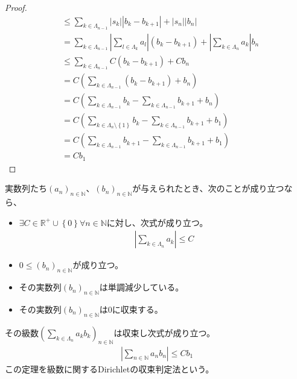 \documentclass[dvipdfmx]{jsarticle}
\begin{document}
\begin{proof}
\begin{align*}
&\leq \sum_{k \in \varLambda_{n - 1}} {\left| s_{k} \right|\left| b_{k} - b_{k + 1} \right|} + \left| s_{n} \right|\left| b_{n} \right|\\
&= \sum_{k \in \varLambda_{n - 1}} {\left| \sum_{l \in \varLambda_{k}} a_{l} \right|\left( b_{k} - b_{k + 1} \right)} + \left| \sum_{k \in \varLambda_{n}} a_{k} \right|b_{n}\\
&\leq \sum_{k \in \varLambda_{n - 1}} {C\left( b_{k} - b_{k + 1} \right)} + Cb_{n}\\
&= C\left( \sum_{k \in \varLambda_{n - 1}} \left( b_{k} - b_{k + 1} \right) + b_{n} \right)\\
&= C\left( \sum_{k \in \varLambda_{n - 1}} b_{k} - \sum_{k \in \varLambda_{n - 1}} b_{k + 1} + b_{n} \right)\\
&= C\left( \sum_{k \in \varLambda_{n} \setminus \left\{ 1 \right\}} b_{k} - \sum_{k \in \varLambda_{n - 1}} b_{k + 1} + b_{1} \right)\\
&= C\left( \sum_{k \in \varLambda_{n - 1}} b_{k + 1} - \sum_{k \in \varLambda_{n - 1}} b_{k + 1} + b_{1} \right)\\
&= Cb_{1}
\end{align*}
\end{proof}
\begin{thm}[級数に関するDirichletの収束判定法]\label{4.1.8.27}
実数列たち$\left( a_{n} \right)_{n \in \mathbb{N}}$、$\left( b_{n} \right)_{n \in \mathbb{N}}$が与えられたとき、次のことが成り立つなら、
\begin{itemize}
\item
  $\exists C \in \mathbb{R}^{+} \cup \left\{ 0 \right\}\forall n \in \mathbb{N}$に対し、次式が成り立つ。
\begin{align*}
\left| \sum_{k \in \varLambda_{n}} a_{k} \right| \leq C
\end{align*}
\item
  $0 \leq \left( b_{n} \right)_{n \in \mathbb{N}}$が成り立つ。
\item
  その実数列$\left( b_{n} \right)_{n \in \mathbb{N}}$は単調減少している。
\item
  その実数列$\left( b_{n} \right)_{n \in \mathbb{N}}$は$0$に収束する。
\end{itemize}
その級数$\left( \sum_{k \in \varLambda_{n}} {a_{k}b_{k}} \right)_{n \in \mathbb{N}}$は収束し次式が成り立つ。
\begin{align*}
\left| \sum_{n \in \mathbb{N}} {a_{n}b_{n}} \right| \leq Cb_{1}
\end{align*}
この定理を級数に関するDirichletの収束判定法という。
\end{thm}
\end{document}
